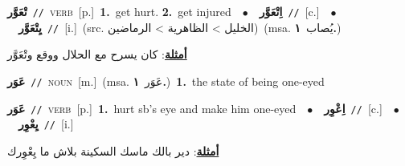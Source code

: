 \documentclass[10pt,a4paper,twoside]{article} %
\begin{document}
\begin{multicols}{2}
{\setlength\topsep{0pt}\textbf{\foreignlanguage{arabic}{تْعَوَّر}}\ {\color{gray}\texttt{//}\color{black}}\ \textsc{verb}\ [p.]\ \textbf{1.}~get hurt.  \textbf{2.}~get injured\ \ $\bullet$\ \ \setlength\topsep{0pt}\textbf{\foreignlanguage{arabic}{اِتْعَوَّر}}\ {\color{gray}\texttt{//}\color{black}}\ [c.]\ \ $\bullet$\ \ \setlength\topsep{0pt}\textbf{\foreignlanguage{arabic}{يِتْعَوَّر}}\ {\color{gray}\texttt{//}\color{black}}\ [i.]\ (src. \color{gray}\foreignlanguage{arabic}{الخليل > الظاهرية > الرماضين}\color{black})\ \color{gray}(msa. \foreignlanguage{arabic}{يُصاب}~\foreignlanguage{arabic}{\textbf{١.}})\color{black}\  \begin{flushright}\color{gray}\foreignlanguage{arabic}{\textbf{\underline{\foreignlanguage{arabic}{أمثلة}}}: كان يسرح مع الحلال ووقع وتْعَوَّر}\end{flushright}\color{black}} \vspace{2mm}

{\setlength\topsep{0pt}\textbf{\foreignlanguage{arabic}{عَوَر}}\ {\color{gray}\texttt{//}\color{black}}\ \textsc{noun}\ [m.]\ \color{gray}(msa. \foreignlanguage{arabic}{عَوَر}~\foreignlanguage{arabic}{\textbf{١.}})\color{black}\ \textbf{1.}~the state of being one-eyed\ } \vspace{2mm}

{\setlength\topsep{0pt}\textbf{\foreignlanguage{arabic}{عَوَر}}\ {\color{gray}\texttt{//}\color{black}}\ \textsc{verb}\ [p.]\ \textbf{1.}~hurt sb's eye and make him one-eyed\ \ $\bullet$\ \ \setlength\topsep{0pt}\textbf{\foreignlanguage{arabic}{اِعْوِر}}\ {\color{gray}\texttt{//}\color{black}}\ [c.]\ \ $\bullet$\ \ \setlength\topsep{0pt}\textbf{\foreignlanguage{arabic}{يِعْوِر}}\ {\color{gray}\texttt{//}\color{black}}\ [i.]\  \begin{flushright}\color{gray}\foreignlanguage{arabic}{\textbf{\underline{\foreignlanguage{arabic}{أمثلة}}}: دير بالك ماسك السكينة بلاش ما يِعْوِرك}\end{flushright}\color{black}} \vspace{2mm}


\end{multicols}
\end{document}
